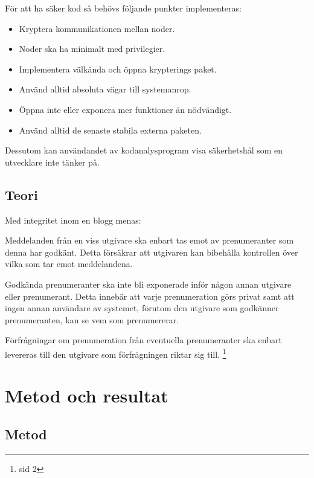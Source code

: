 \documentclass[12pt]{article}
\begin{document}
\begin{minipage}{\textwidth}
För att ha säker kod så behövs följande punkter implementeras:

\begin{itemize} 
		\item Kryptera kommunikationen mellan noder.\footnotemark
		\item Noder ska ha minimalt med privilegier.
		\item Implementera välkända och öppna krypterings paket.
		\item Använd alltid absoluta vägar till systemanrop.
		\item Öppna inte eller exponera mer funktioner än nödvändigt.
		\item Använd alltid de senaste stabila externa paketen.
	\end{itemize}
Dessutom kan användandet av kodanalysprogram visa säkerhetshål som en utvecklare inte tänker på.\cite{101}
\end{minipage}




\subsection{Teori}
Med integritet inom en blogg menas:

Meddelanden från en viss utgivare ska enbart tas emot av prenumeranter som denna har godkänt.
Detta försäkrar att utgivaren kan bibehålla kontrollen över vilka som tar emot meddelandena.

Godkända prenumeranter ska inte bli exponerade inför någon annan utgivare eller prenumerant.
Detta innebär att varje prenumeration görs privat samt att ingen annan användare av systemet, förutom den utgivare som godkänner prenumeranten, kan se vem som prenumererar.

Förfrågningar om prenumeration från eventuella prenumeranter ska enbart levereras till den utgivare som förfrågningen riktar sig till.
\footnote{sid 2\cite{IFC}}



\section{Metod och 	resultat }	



\subsection{ Metod}
\end{document}
